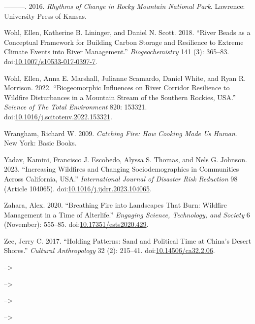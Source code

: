 \documentclass[
]{article}
\newlength{\cslhangindent}
\newenvironment{CSLReferences}[2] %
 {\begin{list}{}{%
  \setlength{\itemindent}{0pt}
  \setlength{\leftmargin}{0pt}
  \setlength{\parsep}{0pt}
  \ifodd #1
   \setlength{\leftmargin}{\cslhangindent}
   \setlength{\itemindent}{-1\cslhangindent}
  \fi
  \setlength{\itemsep}{#2\baselineskip}}}
 {\end{list}}
\begin{document}
\begin{CSLReferences}{1}{0}
---------. 2016. \emph{Rhythms of {Change} in {Rocky Mountain National Park}}. Lawrence: University Press of Kansas.

Wohl, Ellen, Katherine B. Lininger, and Daniel N. Scott. 2018. {``River Beads as a Conceptual Framework for Building Carbon Storage and Resilience to Extreme Climate Events into River Management.''} \emph{Biogeochemistry} 141 (3): 365--83. doi:\href{https://doi.org/10.1007/s10533-017-0397-7}{10.1007/s10533-017-0397-7}.

Wohl, Ellen, Anna E. Marshall, Julianne Scamardo, Daniel White, and Ryan R. Morrison. 2022. {``Biogeomorphic Influences on River Corridor Resilience to Wildfire Disturbances in a Mountain Stream of the {Southern Rockies}, {USA}.''} \emph{Science of The Total Environment} 820: 153321. doi:\href{https://doi.org/10.1016/j.scitotenv.2022.153321}{10.1016/j.scitotenv.2022.153321}.

Wrangham, Richard W. 2009. \emph{Catching Fire: How Cooking Made Us Human}. New York: Basic Books.

Yadav, Kamini, Francisco J. Escobedo, Alyssa S. Thomas, and Nels G. Johnson. 2023. {``Increasing Wildfires and Changing Sociodemographics in Communities Across {California}, {USA}.''} \emph{International Journal of Disaster Risk Reduction} 98 (Article 104065). doi:\href{https://doi.org/10.1016/j.ijdrr.2023.104065}{10.1016/j.ijdrr.2023.104065}.

Zahara, Alex. 2020. {``Breathing {Fire} into {Landscapes} That {Burn}: {Wildfire Management} in a {Time} of {Alterlife}.''} \emph{Engaging Science, Technology, and Society} 6 (November): 555--85. doi:\href{https://doi.org/10.17351/ests2020.429}{10.17351/ests2020.429}.

Zee, Jerry C. 2017. {``Holding {Patterns}: {Sand} and {Political Time} at {China}'s {Desert Shores}.''} \emph{Cultural Anthropology} 32 (2): 215--41. doi:\href{https://doi.org/10.14506/ca32.2.06}{10.14506/ca32.2.06}.

\end{CSLReferences}

\clearpage

\setlength{\parindent}{4em} 
\linespread{1}
\doublespacing

--\textgreater{}

--\textgreater{}

--\textgreater{}

--\textgreater{}
\end{document}
